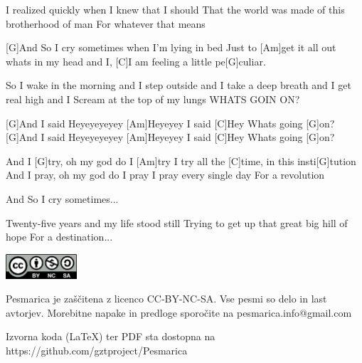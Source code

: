 \documentclass[a4paper,12pt]{article}
\begin{document}
\begin{multicols}{2}
\begin{guitar}
I realized quickly when I knew that I should
That the world was made of this 
brotherhood of man
For whatever that means

                                   
[G]And So I cry sometimes 
when I'm lying in bed
Just to [Am]get it all out
whats in my head and I, 
[C]I am feeling a little pe[G]culiar.

 
So I wake in the morning 
and I step outside
and I take a deep breath 
and I get real high and
I Scream at the top of my lungs 
WHATS GOIN ON?


[G]And I said Heyeyeyeyey 
[Am]Heyeyey
I said [C]Hey Whats going [G]on?
[G]And I said Heyeyeyeyey
[Am]Heyeyey
I said [C]Hey Whats going [G]on?


And I [G]try, oh my god do I [Am]try
I try all the [C]time, in this insti[G]tution
And I pray, oh my god do I pray
I pray every single day
For a revolution

               
And So I cry sometimes...


Twenty-five years and my life stood still
Trying to get up that great big hill of hope
For a destination...


\end{guitar}
\end{multicols}
\clearpage
\clearpage
\null
\vfill
\center
\includegraphics[width=100px]{img/licence.png}

Pesmarica je zaščitena z licenco CC-BY-NC-SA. Vse pesmi so delo in last avtorjev. Morebitne napake in predloge sporočite na pesmarica.info@gmail.com 

Izvorna koda (LaTeX) ter PDF sta dostopna na https://github.com/gztproject/Pesmarica
\end{document}
